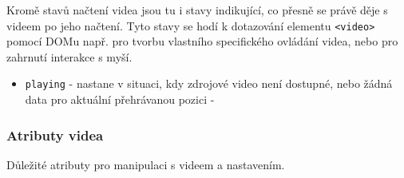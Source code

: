 Kromě  stavů načtení videa jsou tu i stavy indikující, co přesně se právě děje s videem po jeho načtení. Tyto stavy se hodí k dotazování elementu \texttt{<video>} pomocí DOMu např. pro tvorbu vlastního specifického ovládání videa, nebo pro zahrnutí interakce s myší.

\begin{itemize}
	\item \texttt{playing}\newline
	- nastane v situaci, kdy zdrojové video není dostupné, nebo žádná data pro aktuální přehrávanou pozici \newline - 
\end{itemize}


\newpage
\subsubsection{Atributy videa}
Důležité atributy pro manipulaci s videem a nastavením.



